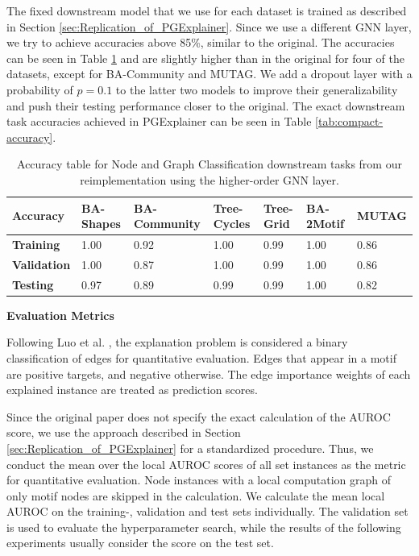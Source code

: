 The fixed downstream model that we use for each dataset is trained as described in Section \ref{sec:Replication_of_PGExplainer}. Since we use a different GNN layer, we try to achieve accuracies above 85\%, similar to the original. The accuracies can be seen in Table \ref{tab:our-dt-accuracy} and are slightly higher than in the original for four of the datasets, except for BA-Community and MUTAG. We add a dropout layer with a probability of $p=0.1$ to the latter two models to improve their generalizability and push their testing performance closer to the original. The exact downstream task accuracies achieved in PGExplainer \cite{luo2020parameterized} can be seen in Table \ref{tab:compact-accuracy}. \bigskip

\begin{table}[h]
    \centering
    \scriptsize
    \begin{tabularx}{\linewidth}{l|X X X X|X X}
    \hline
    \textbf{Accuracy} & \textbf{BA-Shapes} & \textbf{BA-Community} & \textbf{Tree-Cycles} & \textbf{Tree-Grid} & \textbf{BA-2Motif} & \textbf{MUTAG} \\
    \hline
    \textbf{Training}   & 1.00 & 0.92 & 1.00 & 0.99 & 1.00 & 0.86 \\
    \textbf{Validation} & 1.00 & 0.87 & 1.00 & 0.99 & 1.00 & 0.86 \\
    \textbf{Testing}    & 0.97 & 0.89 & 0.99 & 0.99 & 1.00 & 0.82 \\
    \hline
    \end{tabularx}
    \caption[Accuracies of higher-order GNN downstream task]{Accuracy table for Node and Graph Classification downstream tasks from our reimplementation using the higher-order GNN layer.}
    \label{tab:our-dt-accuracy}
\end{table}
\newpage
\textbf{Evaluation Metrics}\par
Following Luo et al. \cite{luo2020parameterized}, the explanation problem is considered a binary classification of edges for quantitative evaluation. Edges that appear in a motif are positive targets, and negative otherwise. The edge importance weights of each explained instance are treated as prediction scores.

Since the original paper does not specify the exact calculation of the AUROC score, we use the approach described in Section \ref{sec:Replication_of_PGExplainer} for a standardized procedure. Thus, we conduct the mean over the local AUROC scores of all set instances as the metric for quantitative evaluation. Node instances with a local computation graph of only motif nodes are skipped in the calculation. We calculate the mean local AUROC on the training-, validation and test sets individually. The validation set is used to evaluate the hyperparameter search, while the results of the following experiments usually consider the score on the test set. \bigskip

